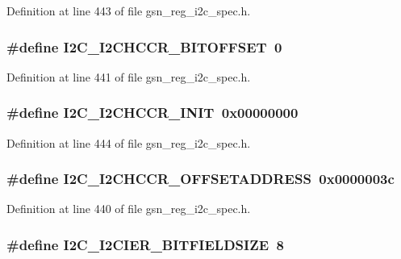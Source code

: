 Definition at line 443 of file gsn\_\-reg\_\-i2c\_\-spec.h.

\hypertarget{a00558_a6bcb89e6e880c0b0b650457e29f7a1df}{
\subsubsection[{I2C\_\-I2CHCCR\_\-BITOFFSET}]{\setlength{\rightskip}{0pt plus 5cm}\#define I2C\_\-I2CHCCR\_\-BITOFFSET~0}}
\label{a00558_a6bcb89e6e880c0b0b650457e29f7a1df}


Definition at line 441 of file gsn\_\-reg\_\-i2c\_\-spec.h.

\hypertarget{a00558_abcebfae28ba4bb045cdc7d624bc89019}{
\subsubsection[{I2C\_\-I2CHCCR\_\-INIT}]{\setlength{\rightskip}{0pt plus 5cm}\#define I2C\_\-I2CHCCR\_\-INIT~0x00000000}}
\label{a00558_abcebfae28ba4bb045cdc7d624bc89019}


Definition at line 444 of file gsn\_\-reg\_\-i2c\_\-spec.h.

\hypertarget{a00558_a26ec2c9f9b5e9e0de8f02017e3fcf845}{
\subsubsection[{I2C\_\-I2CHCCR\_\-OFFSETADDRESS}]{\setlength{\rightskip}{0pt plus 5cm}\#define I2C\_\-I2CHCCR\_\-OFFSETADDRESS~0x0000003c}}
\label{a00558_a26ec2c9f9b5e9e0de8f02017e3fcf845}


Definition at line 440 of file gsn\_\-reg\_\-i2c\_\-spec.h.

\hypertarget{a00558_aa64cd29d70af25686170c391c33d97ab}{
\subsubsection[{I2C\_\-I2CIER\_\-BITFIELDSIZE}]{\setlength{\rightskip}{0pt plus 5cm}\#define I2C\_\-I2CIER\_\-BITFIELDSIZE~8}}
\label{a00558_aa64cd29d70af25686170c391c33d97ab}



